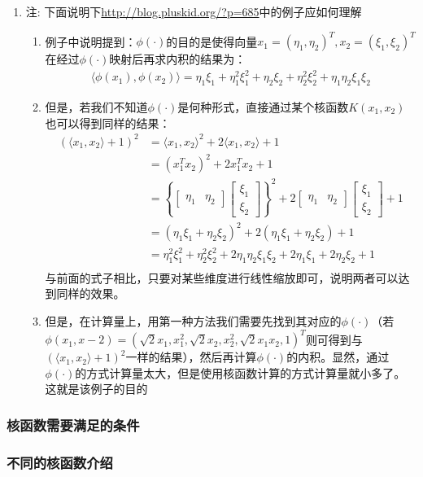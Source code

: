 \begin{enumerate}
	\item 注: 下面说明下\url{http://blog.pluskid.org/?p=685}中的例子应如何理解
	\begin{enumerate}
		\item 例子中说明提到：$\phi(\cdot)$的目的是使得向量$x_1=(\eta_1, \eta_2)^T, x_2=(\xi_1, \xi_2)^T$在经过$\phi(\cdot)$映射后再求内积的结果为：
		\begin{align}
			\langle \phi(x_1), \phi(x_2) \rangle = \eta_1\xi_1 + \eta_1^2\xi_1^2 + \eta_2\xi_2 + \eta_2^2\xi_2^2 + \eta_1\eta_2\xi_1\xi_2
		\end{align}
		\item 但是，若我们不知道$\phi(\cdot)$是何种形式，直接通过某个核函数$K(x_1, x_2)$也可以得到同样的结果：
		\begin{align}
			\left( \langle x_1, x_2 \rangle +1 \right)^2 &= \langle x_1, x_2 \rangle ^2 + 2 \langle x_1, x_2 \rangle + 1 \\
			&= (x_1^T x_2)^2 + 2x_1^T x_2 + 1 \\
			&=\left\{ \left[\begin{matrix}\eta_1 & \eta_2\end{matrix}\right]\left[\begin{matrix}\xi_1 \\ \xi_2\end{matrix}\right] \right\}^2 + 2\left[\begin{matrix}\eta_1 & \eta_2\end{matrix}\right]\left[\begin{matrix}\xi_1 \\ \xi_2\end{matrix}\right] + 1 \\
			&= (\eta_1\xi_1+\eta_2\xi_2)^2 + 2(\eta_1\xi_1+\eta_2\xi_2) + 1 \\
			&= \eta_1^2\xi_1^2 + \eta_2^2\xi_2^2 + 2\eta_1\eta_2\xi_1\xi_2 + 2\eta_1\xi_1 + 2\eta_2\xi_2 + 1 \\
		\end{align}
		与前面的式子相比，只要对某些维度进行线性缩放即可，说明两者可以达到同样的效果。
		\item 但是，在计算量上，用第一种方法我们需要先找到其对应的$\phi(\cdot)$（若$\phi(x_1, x-2)=(\sqrt{2}x_1, x_1^2, \sqrt{2}x_2, x_2^2, \sqrt{2}x_1x_2, 1)^T$则可得到与$\left( \langle x_1, x_2 \rangle +1 \right)^2$一样的结果），然后再计算$\phi(\cdot)$的内积。显然，通过$\phi(\cdot)$的方式计算量太大，但是使用核函数计算的方式计算量就小多了。这就是该例子的目的
	\end{enumerate}

\end{enumerate}

\subsubsection{核函数需要满足的条件}


\subsubsection{不同的核函数介绍}




















